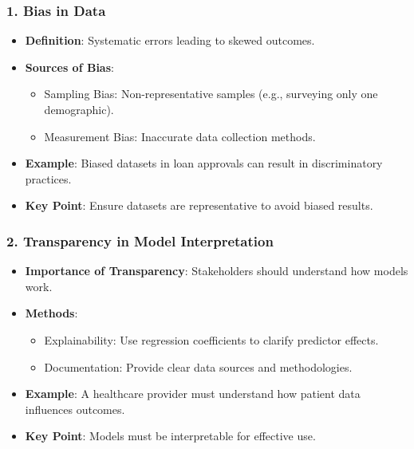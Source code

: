 \documentclass[aspectratio=169]{beamer}
\begin{document}
\begin{frame}[fragile]
    \frametitle{1. Bias in Data}
    \begin{itemize}
        \item \textbf{Definition}: Systematic errors leading to skewed outcomes.
        \item \textbf{Sources of Bias}:
        \begin{itemize}
            \item Sampling Bias: Non-representative samples (e.g., surveying only one demographic).
            \item Measurement Bias: Inaccurate data collection methods.
        \end{itemize}
        \item \textbf{Example}: Biased datasets in loan approvals can result in discriminatory practices.
        \item \textbf{Key Point}: Ensure datasets are representative to avoid biased results.
    \end{itemize}
\end{frame}

\begin{frame}[fragile]
    \frametitle{2. Transparency in Model Interpretation}
    \begin{itemize}
        \item \textbf{Importance of Transparency}: Stakeholders should understand how models work.
        \item \textbf{Methods}:
        \begin{itemize}
            \item Explainability: Use regression coefficients to clarify predictor effects.
            \item Documentation: Provide clear data sources and methodologies.
        \end{itemize}
        \item \textbf{Example}: A healthcare provider must understand how patient data influences outcomes.
        \item \textbf{Key Point}: Models must be interpretable for effective use.
    \end{itemize}
\end{frame}
\end{document}
